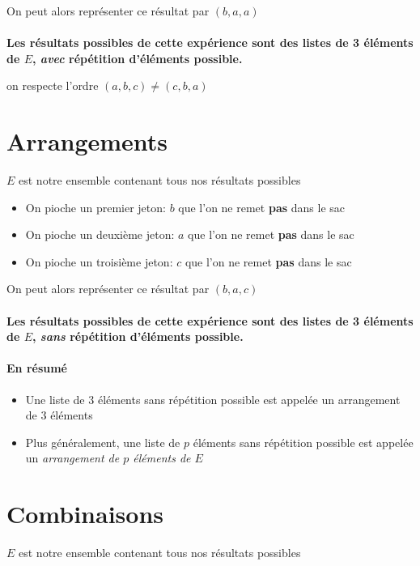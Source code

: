 On peut alors représenter ce résultat par $(b, a, a)$ \\ \\
\textbf{Les résultats possibles de cette expérience sont des listes de 3 éléments de $E$,
\emph{avec} répétition d’éléments possible.}

 on respecte l'ordre $(a, b, c) \neq (c, b, a)$

\pagebreak

\section{Arrangements}
$E$ est notre ensemble contenant tous nos résultats possibles

\begin{itemize}
  \item On pioche un premier jeton: $b$ que l’on ne remet \textbf{pas} dans le sac
  \item On pioche un deuxième jeton: $a$ que l’on ne remet \textbf{pas} dans le sac
  \item On pioche un troisième jeton: $c$ que l’on ne remet \textbf{pas} dans le sac
\end{itemize}

On peut alors représenter ce résultat par $(b, a, c)$ \\ \\
\textbf{Les résultats possibles de cette expérience sont des listes de 3 éléments de $E$, 
\emph{sans} répétition d’éléments possible.}

\paragraph{En résumé}
\begin{itemize}
  \item Une liste de $3$ éléments sans répétition possible est appelée un arrangement de $3$ éléments
  \item Plus généralement, une liste de $p$ éléments sans répétition possible est appelée un \emph{arrangement de $p$ éléments de $E$} 
\end{itemize}

\pagebreak

\section{Combinaisons}
$E$ est notre ensemble contenant tous nos résultats possibles

